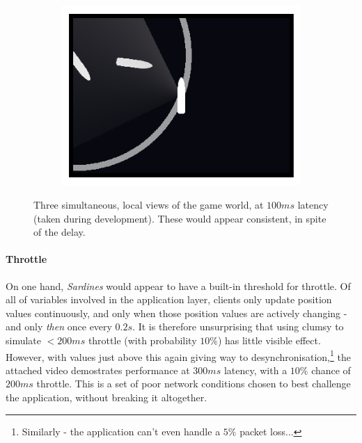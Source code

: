 \documentclass[a4paper, 9pt]{article}
\begin{document}
\begin{flushleft}
\begin{figure}[h]
\begin{subfigure}[b]{0.3\textwidth}
\includegraphics[width=\textwidth]{100ms Latency (1)}
\end{subfigure}
\caption{Three simultaneous, local views of the game world, at $100ms$ latency (taken during development). These would appear consistent, in spite of the delay.}
\label{Lag Testing}
\end{figure}

\paragraph{Throttle} On one hand, \textit{Sardines} would appear to have a built-in threshold for throttle. Of all of variables involved in the application layer, clients only update position values continuously, and only when those position values are actively changing - and only \textit{then} once every $0.2s$. It is therefore unsurprising that using clumsy to simulate $<200ms$ throttle (with probability $10\%$) has little visible effect. However, with values just above this again giving way to desynchronisation,\footnote{Similarly - the application can't even handle a $5\%$ packet loss...} the attached video demostrates performance at $300ms$ latency, with a $10\%$ chance of $200ms$ throttle. This is a set of poor network conditions chosen to best challenge the application, without breaking it altogether.%




\end{flushleft}
\end{document}
